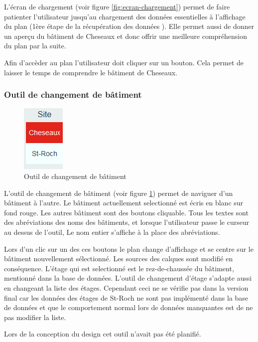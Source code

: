 \documentclass[
    iai, %
    il, %
]{heig-tb}
\begin{document}
L'écran de chargement (voir figure \ref{fig:ecran-chargement}) permet de faire patienter l'utilisateur jusqu'au chargement des données essentielles à l'affichage du plan
(1ère étape de la récupération des données ).
Elle permet aussi de donner un aperçu du bâtiment de Cheseaux et donc offrir une meilleure compréhension du plan par la suite.

Afin d'accèder au plan l'utilisateur doit cliquer sur un bouton. Cela permet de laisser le temps de comprendre le bâtiment de Cheseaux.

\subsubsection{Outil de changement de bâtiment}

\begin{figure}[h]
    \centering
    \includegraphics[scale=0.8]{frontend-buildingChange.png}
    \caption{Outil de changement de bâtiment}
    \label{fig:changement-batiment}
\end{figure}

L'outil de changement de bâtiment (voir figure \ref{fig:changement-batiment}) permet de naviguer d'un bâtiment à l'autre.
Le bâtiment actuellement selectionné est écris en blanc sur fond rouge. Les autres bâtiment sont des boutons cliquable.
Tous les textes  sont des abréviations des noms des bâtiments, et lorsque l'utilisateur passe le curseur au dessus de l'outil,
Le nom entier s'affiche à la place des abréviations.

Lors d'un clic sur un des ces boutons le plan change d'affichage et se centre sur le bâtiment nouvellement sélectionné.
Les sources des calques sont modifié en conséquence.
L'étage qui est selectionné est le rez-de-chaussée du bâtiment, mentionné dans la base de données.
L'outil de changement d'étage s'adapte aussi en changeant la liste des étages.
Cependant ceci ne se vérifie pas dans la version final car les données des étages de St-Roch ne sont pas implémenté dans la base de données
et que le comportement normal lors de données manquantes est de ne pas modifier la liste.

Lors de la conception du design cet outil n'avait pas été planifié.
\end{document}
